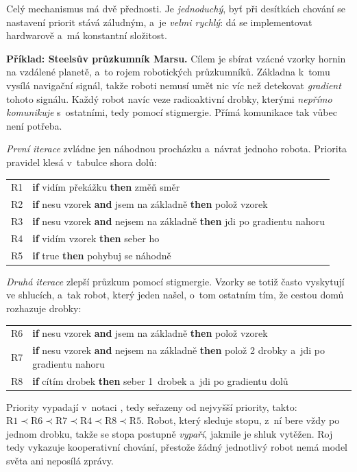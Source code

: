 \documentclass[11pt,a4paper]{article}
\theoremstyle{definition}
\begin{document}
Celý mechanismus má dvě přednosti. Je \emph{jednoduchý}, byť při desítkách chování se
nastavení priorit stává záludným, a~je \emph{velmi rychlý}: dá se implementovat hardwarově
a~má konstantní složitost.

\medskip
\noindent\textbf{Příklad: Steelsův průzkumník Marsu.}
Cílem je sbírat vzácné vzorky hornin na vzdálené planetě, a~to rojem robotických průzkumníků.
Základna k~tomu vysílá navigační signál, takže roboti nemusí umět nic víc než detekovat
\emph{gradient} tohoto signálu. Každý robot navíc veze radioaktivní drobky, kterými
\emph{nepřímo komunikuje} s~ostatními, tedy pomocí stigmergie. Přímá komunikace tak vůbec není
potřeba.

\emph{První iterace} zvládne jen náhodnou procházku a~návrat jednoho robota. Priorita pravidel
klesá v~tabulce shora dolů:
\begin{center}\small
\begin{tabular}{ll}
\toprule
R1 & \textbf{if} vidím překážku \textbf{then} změň směr \\
R2 & \textbf{if} nesu vzorek \textbf{and} jsem na základně \textbf{then} polož vzorek \\
R3 & \textbf{if} nesu vzorek \textbf{and} nejsem na základně \textbf{then} jdi po gradientu nahoru \\
R4 & \textbf{if} vidím vzorek \textbf{then} seber ho \\
R5 & \textbf{if} true \textbf{then} pohybuj se náhodně \\
\bottomrule
\end{tabular}
\end{center}

\emph{Druhá iterace} zlepší průzkum pomocí stigmergie. Vzorky se totiž často vyskytují ve
shlucích, a~tak robot, který jeden našel, o~tom ostatním  tím, že cestou domů
rozhazuje drobky:
\begin{center}\small
\begin{tabular}{ll}
\toprule
R6 & \textbf{if} nesu vzorek \textbf{and} jsem na základně \textbf{then} polož vzorek \\
R7 & \textbf{if} nesu vzorek \textbf{and} nejsem na základně \textbf{then} polož 2 drobky
     a~jdi po gradientu nahoru \\
R8 & \textbf{if} cítím drobek \textbf{then} seber 1~drobek a~jdi po gradientu dolů \\
\bottomrule
\end{tabular}
\end{center}
Priority vypadají v~notaci , tedy seřazeny od nejvyšší priority, takto:
$\mathrm{R1} \prec \mathrm{R6} \prec \mathrm{R7} \prec \mathrm{R4} \prec
\mathrm{R8} \prec \mathrm{R5}$. Robot, který sleduje stopu, z~ní bere vždy po jednom drobku,
takže se stopa postupně \emph{vypaří}, jakmile je shluk vytěžen. Roj tedy vykazuje kooperativní
chování, přestože žádný jednotlivý robot nemá model světa ani neposílá zprávy.
\end{document}
